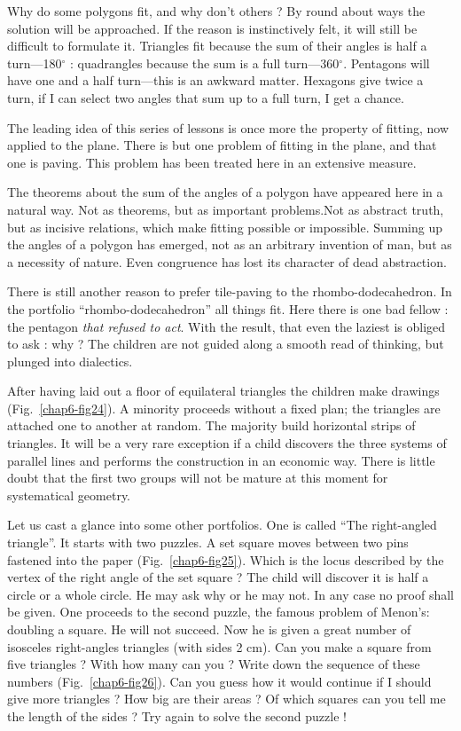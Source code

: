 Why do some polygons fit, and why don't others ? By round about ways the solution will be approached. If the reason is instinctively felt, it will still be difficult to formulate it. Triangles fit because the sum of their angles is half a turn---180$^{\circ}$ : quadrangles because the sum is a full turn---360$^{\circ}$. Pentagons will have one and a half turn---this is an awkward matter. Hexagons give twice a turn, if I can select two angles that sum up to a full turn, I get a chance.

The leading idea of this series of lessons is once more the property of fitting, now applied to the plane. There is but one problem of fitting in the plane, and that one is paving. This problem has been treated here in an extensive measure.

The theorems about the sum of the angles of a polygon have appeared here in a natural way. Not as theorems, but as important problems.\pageoriginale Not as abstract truth, but as incisive relations, which make fitting possible or impossible. Summing up the angles of a polygon has emerged, not as an arbitrary invention of man, but as a necessity of nature. Even congruence has lost its character of dead abstraction.

There is still another reason to prefer tile-paving to the rhombo-dodecahedron. In the portfolio ``rhombo-dodecahedron'' all things fit. Here there is one bad fellow : the pentagon {\em that refused to act}. With the result, that even the laziest is obliged to ask : why ? The children are not guided along a smooth read of thinking, but plunged into dialectics.

After having laid out a floor of equilateral triangles the children make drawings (Fig.~\ref{chap6-fig24}). A minority proceeds without a fixed plan; the triangles are attached one to another at random. The majority build horizontal strips of triangles. It will be a very rare exception if a child discovers the three systems of parallel lines and performs the construction in an economic way. There is little doubt that the first two groups will not be mature at this moment for systematical geometry.

Let us cast a glance into some other portfolios. One is called ``The right-angled triangle''. It starts with two puzzles. A set square moves between two pins fastened into the paper (Fig.~\ref{chap6-fig25}). Which is the locus described by the vertex of the right angle of the set square ? The child will discover it is half a circle or a whole circle. He may ask why or he may not. In any case no proof shall be given. One proceeds to the second puzzle, the famous problem of Menon's: doubling a square. He will not succeed. Now he is given a great number of isosceles right-angles triangles (with sides 2 cm). Can you make a square from five triangles ? With how many can you ? Write down the sequence of these numbers (Fig.~\ref{chap6-fig26}). Can you guess how it would continue if I should give more triangles ? How big are their areas ? Of which squares can you tell me the length of the sides ? Try again to solve the second puzzle !

